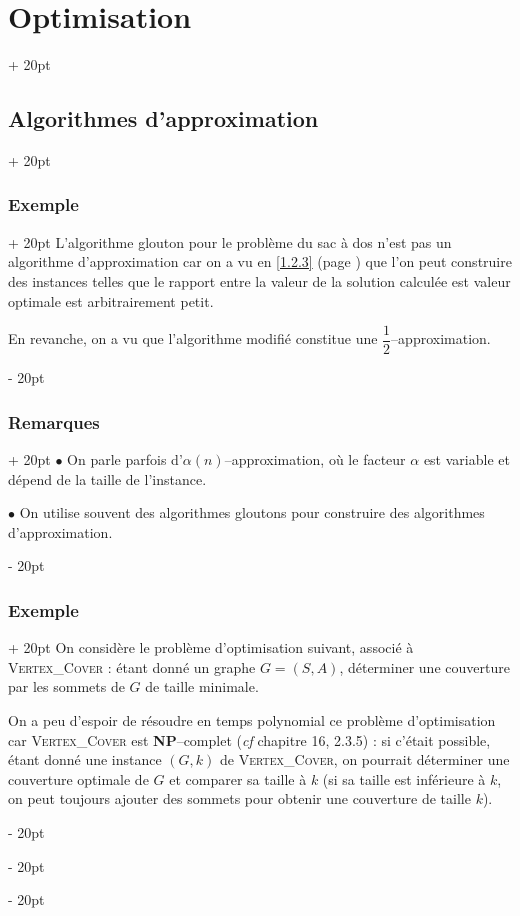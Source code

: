 \documentclass[a4paper, 12pt, twoside]{article}
\newcommand{\ind}[1][20pt]{\advance\leftskip + #1}
\newcommand{\deind}[1][20pt]{\advance\leftskip - #1}
\newenvironment{indt}[2][20pt]{#2 \par \ind[#1]}{\par \deind} %
\newcommand{\1}{\mathbbm 1}
\begin{document}
\begin{indt}{\section{Optimisation}}
\begin{indt}{\subsection{Algorithmes d'approximation}}
            \begin{indt}{\subsubsection{Exemple}}
                L'algorithme glouton pour le problème du sac à dos n'est pas un algorithme d'approximation car on a vu en \ref{1.2.3} (page \pageref{1.2.3}) que l'on peut construire des instances telles que le rapport entre la valeur de la solution calculée est valeur optimale est arbitrairement petit.

                En revanche, on a vu que l'algorithme modifié constitue une $\dfrac 1 2$--approximation.
            \end{indt}

            \vspace{12pt}
            
            \begin{indt}{\subsubsection{Remarques}}
                $\bullet$ On parle parfois d'$\alpha(n)$--approximation, où le facteur $\alpha$ est variable et dépend de la taille de l'instance.

                $\bullet$ On utilise souvent des algorithmes gloutons pour construire des algorithmes d'approximation.
            \end{indt}

            \vspace{12pt}
            
            \begin{indt}{\subsubsection{Exemple}}
                On considère le problème d'optimisation suivant, associé à \textsc{Vertex\_Cover} : étant donné un graphe $G = (S, A)$, déterminer une couverture par les sommets de $G$ de taille minimale.

                On a peu d'espoir de résoudre en temps polynomial ce problème d'optimisation car \textsc{Vertex\_Cover} est \textbf{NP}--complet (\textit{cf} chapitre 16, 2.3.5) : si c'était possible, étant donné une instance $(G, k)$ de \textsc{Vertex\_Cover}, on pourrait déterminer une couverture optimale de $G$ et comparer sa taille à $k$ (si sa taille est inférieure à $k$, on peut toujours ajouter des sommets pour obtenir une couverture de taille $k$).


\end{indt}
\end{indt}
\end{indt}
\end{document}
